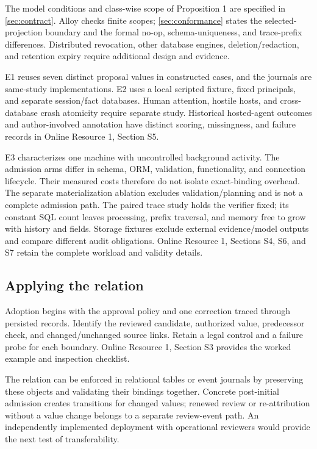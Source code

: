 The model conditions and class-wise scope of Proposition 1 are specified in \cref{sec:contract}. Alloy checks finite scopes; \cref{sec:conformance} states the selected-projection boundary and the formal no-op, schema-uniqueness, and trace-prefix differences. Distributed revocation, other database engines, deletion/redaction, and retention expiry require additional design and evidence.

E1 reuses seven distinct proposal values in constructed cases, and the journals are same-study implementations. E2 uses a local scripted fixture, fixed principals, and separate session/fact databases. Human attention, hostile hosts, and cross-database crash atomicity require separate study. Historical hosted-agent outcomes and author-involved annotation have distinct scoring, missingness, and failure records in Online Resource 1, Section S5.

E3 characterizes one machine with uncontrolled background activity. The admission arms differ in schema, ORM, validation, functionality, and connection lifecycle. Their measured costs therefore do not isolate exact-binding overhead. The separate materialization ablation excludes validation/planning and is not a complete admission path. The paired trace study holds the verifier fixed; its constant SQL count leaves processing, prefix traversal, and memory free to grow with history and fields. Storage fixtures exclude external evidence/model outputs and compare different audit obligations. Online Resource 1, Sections S4, S6, and S7 retain the complete workload and validity details.

\subsection{Applying the relation}

Adoption begins with the approval policy and one correction traced through persisted records. Identify the reviewed candidate, authorized value, predecessor check, and changed/unchanged source links. Retain a legal control and a failure probe for each boundary. Online Resource 1, Section S3 provides the worked example and inspection checklist.

The relation can be enforced in relational tables or event journals by preserving these objects and validating their bindings together. Concrete post-initial admission creates transitions for changed values; renewed review or re-attribution without a value change belongs to a separate review-event path. An independently implemented deployment with operational reviewers would provide the next test of transferability.
